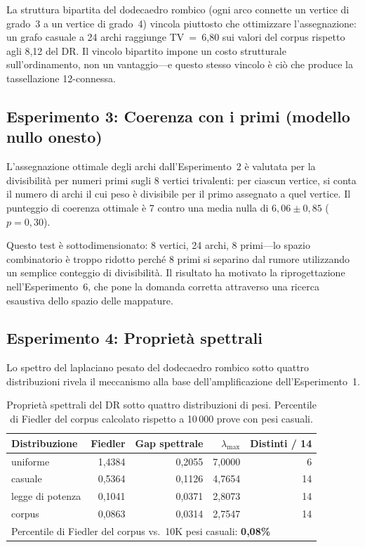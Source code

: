 \documentclass[11pt]{article}
\begin{document}
La struttura bipartita del dodecaedro rombico (ogni arco connette un
vertice di grado~3 a un vertice di grado~4) vincola piuttosto che
ottimizzare l'assegnazione: un grafo casuale a 24 archi raggiunge
TV~=~6,80 sui valori del corpus rispetto agli 8,12 del DR. Il vincolo
bipartito impone un costo strutturale sull'ordinamento, non un
vantaggio---e questo stesso vincolo \`e ci\`o che produce la
tassellazione 12-connessa.

\subsection{Esperimento 3: Coerenza con i primi (modello nullo onesto)}

L'assegnazione ottimale degli archi dall'Esperimento~2 \`e valutata per
la divisibilit\`a per numeri primi sugli 8 vertici trivalenti: per
ciascun vertice, si conta il numero di archi il cui peso \`e divisibile
per il primo assegnato a quel vertice. Il punteggio di coerenza ottimale
\`e 7 contro una media nulla di $6{,}06 \pm 0{,}85$ ($p = 0{,}30$).

Questo test \`e sottodimensionato: 8 vertici, 24 archi, 8 primi---lo
spazio combinatorio \`e troppo ridotto perch\'e 8 primi si separino dal
rumore utilizzando un semplice conteggio di divisibilit\`a. Il risultato
ha motivato la riprogettazione nell'Esperimento~6, che pone la domanda
corretta attraverso una ricerca esaustiva dello spazio delle mappature.

\subsection{Esperimento 4: Propriet\`a spettrali}

Lo spettro del laplaciano pesato del dodecaedro rombico sotto quattro
distribuzioni rivela il meccanismo alla base dell'amplificazione
dell'Esperimento~1.

\begin{table}[H]
\centering
\caption{Propriet\`a spettrali del DR sotto quattro distribuzioni di
  pesi. Percentile di Fiedler del corpus calcolato rispetto a 10\,000
  prove con pesi casuali.}
\label{tab:exp4}
\begin{tabular}{lrrrr}
\toprule
Distribuzione & Fiedler & Gap spettrale & $\lambda_{\max}$ & Distinti / 14 \\
\midrule
uniforme    & 1,4384 & 0,2055 & 7,0000 & 6 \\
casuale     & 0,5364 & 0,1126 & 4,7654 & 14 \\
legge di potenza  & 0,1041 & 0,0371 & 2,8073 & 14 \\
corpus     & 0,0863 & 0,0314 & 2,7547 & 14 \\
\midrule
\multicolumn{5}{l}{Percentile di Fiedler del corpus vs.\ 10K pesi casuali: \textbf{0,08\%}} \\
\bottomrule
\end{tabular}
\end{table}
\end{document}

